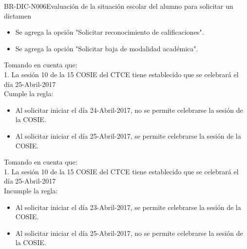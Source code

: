 \begin{BusinessRule}{BR-DIC-N006}{Evaluación de la situación escolar del alumno para solicitar un dictamen}{\bcAutorization}
\begin{enumerate}
			\begin{itemize}
			 \item Se agrega la opción "Solicitar reconocimiento de calificaciones".
			 \item Se agrega la opción "Solicitar baja de modalidad académica".
			 \end{itemize}
	\end{enumerate}
		Tomando en cuenta que:\\
			 1. La sesión 10 de la 15 COSIE del CTCE tiene establecido que se celebrará el día 25-Abril-2017\\ 
	Cumple la regla:
	\begin{itemize}
		\item Al solicitar iniciar el día 24-Abril-2017, no se permite celebrarse la sesión de la COSIE.
		\item Al solicitar iniciar el día 25-Abril-2017, se permite celebrarse la sesión de la COSIE.
	\end{itemize}
	Tomando en cuenta que:\\
			 1. La sesión 10 de la 15 COSIE del CTCE tiene establecido que se celebrará el día 25-Abril-2017\\ 
	Incumple la regla:
	\begin{itemize}
		\item Al solicitar iniciar el día 23-Abril-2017, se permite celebrarse la sesión de la COSIE.
		\item Al solicitar iniciar el día 25-Abril-2017, no se permite celebrarse la sesión de la COSIE.	\end{itemize}
\end{BusinessRule}


